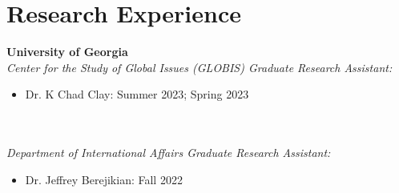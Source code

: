 \documentclass[letterpaper,12pt]{article}
\begin{document}
\section{Research Experience}
\textbf{University of Georgia}\\
\textit{Center for the Study of Global Issues (GLOBIS) Graduate Research Assistant:}\\
\begin{minipage}[t]{\linewidth}
\begin{itemize}
    \item Dr. K Chad Clay: Summer 2023; Spring 2023
\end{itemize}
\end{minipage}
\\
\\
\textit{Department of International Affairs Graduate Research Assistant:}\\
\begin{minipage}[t]{\linewidth}
\begin{itemize}
    \item Dr. Jeffrey Berejikian: Fall 2022
\end{itemize}
\end{minipage}

\end{document}
